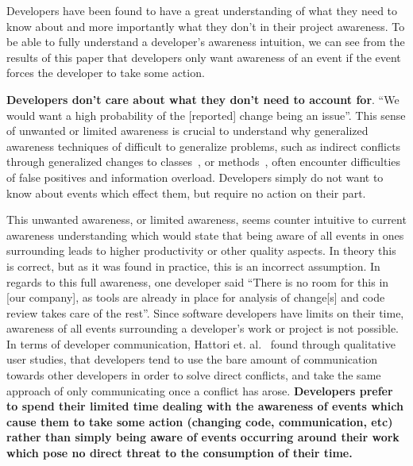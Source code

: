 \documentclass[conference]{IEEEtran}
\begin{document}
Developers have been found to have a great understanding of what they need to know about and more importantly what they don't in
their project awareness. To be able to fully understand a developer's awareness intuition, we can see from the results of this paper that
developers only want awareness of an event if the event forces the developer to take some action.

\textbf{Developers don't care about what they don't need to account for}. ``We would want a high probability of the [reported] change being an issue''.
This sense of unwanted or limited awareness is crucial to understand why generalized
awareness techniques of difficult to generalize problems, such as indirect conflicts through generalized changes to
classes~\cite{Sarma:2007:TSA}, or methods~\cite{Trainer:2005:BGT,Servant:2010:CPI}, often encounter difficulties of false
positives and information overload.
Developers simply do not want to know about events which effect them, but require no action on their part.

This unwanted awareness, or limited awareness, seems counter intuitive to current awareness understanding which would state that
being aware of all events in ones surrounding leads to higher productivity or other quality aspects. In theory this is correct,
but as it was found in practice, this is an incorrect assumption.
In regards to this full awareness, one developer said ``There is no room for this in [our company], as tools are already in place for
analysis of change[s] and code review takes care of the rest''. Since software developers have limits on their time, awareness of
all events surrounding a developer's work or project is not possible.
In terms of developer communication, Hattori et. al.~\cite{Hattori:2012:ICG} found through qualitative user studies, that developers
tend to use the bare amount of communication
towards other developers in order to solve direct conflicts, and take the same approach of only communicating once a conflict has arose.
\textbf{Developers prefer to spend their limited time dealing with
the awareness of events which cause them to take some action (changing code, communication, etc) rather than simply being aware
of events occurring around their work which pose no direct threat to the consumption of their time.}
\end{document}
